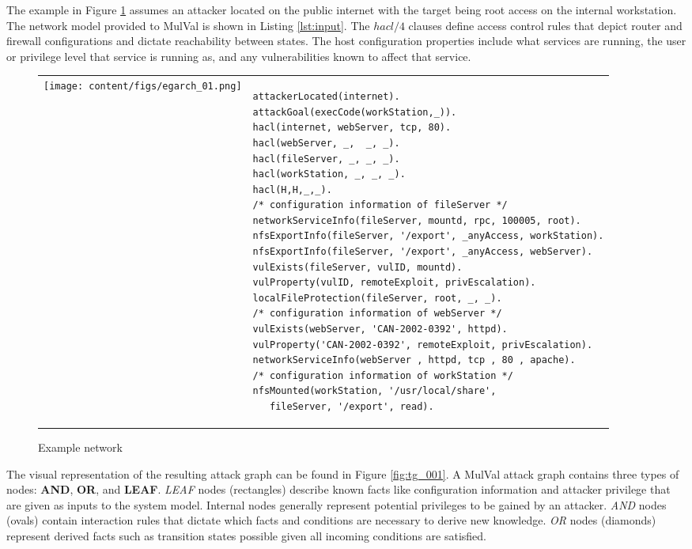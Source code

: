 The example in Figure \ref{fig:eg_net01} assumes an attacker located on the public internet with the target being root access on the internal workstation. The network model provided to MulVal is shown in Listing \ref{lst:input}. The $hacl/4$ clauses define access control rules that depict router and firewall configurations and dictate reachability between states. The host configuration properties include what services are running, the user or privilege level that service is running as, and any vulnerabilities known to affect that service.

\begin{figure}[ht]
\begin{tabular}{p{}p{}}
\begin{minipage}{.38\textwidth}
\centering
\texttt{[image: content/figs/egarch\_01.png]}
\caption{Example network}
\label{fig:eg_net01}
\end{minipage}
&
\begin{minipage}{.57\textwidth}
\begin{lstlisting}[style=datalog, label={lst:input}, caption={input.P \cite{Ou_Boyer_McQueen_2006}}]
attackerLocated(internet).
attackGoal(execCode(workStation,_)).
hacl(internet, webServer, tcp, 80).
hacl(webServer, _,  _, _).
hacl(fileServer, _, _, _).
hacl(workStation, _, _, _).
hacl(H,H,_,_).
/* configuration information of fileServer */
networkServiceInfo(fileServer, mountd, rpc, 100005, root).
nfsExportInfo(fileServer, '/export', _anyAccess, workStation).
nfsExportInfo(fileServer, '/export', _anyAccess, webServer).
vulExists(fileServer, vulID, mountd).
vulProperty(vulID, remoteExploit, privEscalation).
localFileProtection(fileServer, root, _, _).
/* configuration information of webServer */
vulExists(webServer, 'CAN-2002-0392', httpd).
vulProperty('CAN-2002-0392', remoteExploit, privEscalation).
networkServiceInfo(webServer , httpd, tcp , 80 , apache).
/* configuration information of workStation */
nfsMounted(workStation, '/usr/local/share', 
   fileServer, '/export', read).
\end{lstlisting}
\end{minipage}
\end{tabular}
\end{figure}

 The visual representation of the resulting attack graph can be found in Figure \ref{fig:tg_001}. A MulVal attack graph contains three types of nodes: \textbf{AND}, \textbf{OR}, and \textbf{LEAF}. \textit{LEAF} nodes (rectangles) describe known facts like configuration information and attacker privilege that are given as inputs to the system model. Internal nodes generally represent potential privileges to be gained by an attacker.  \textit{AND} nodes (ovals) contain interaction rules that dictate which facts and conditions are necessary to derive new knowledge. \textit{OR} nodes (diamonds) represent derived facts such as transition states possible given all incoming conditions are satisfied.

